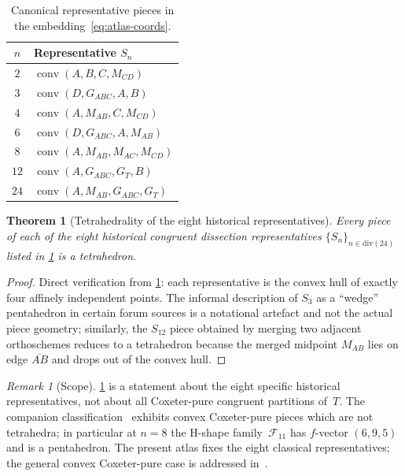 \documentclass[11pt,a4paper]{article}
\theoremstyle{plain}
\newtheorem{theorem}{Theorem}[section]
\theoremstyle{definition}
\theoremstyle{remark}
\newtheorem{remark}[remark]{Remark}
\DeclareMathOperator{\conv}{conv}
\begin{document}
\begin{table}[H]
\centering\small
\caption{Canonical representative pieces in the embedding~\eqref{eq:atlas-coords}.}
\label{tab:atlas-reps}
\begin{tabular}{@{}cl@{}}
\toprule
$n$ & Representative $S_{n}$ \\
\midrule
$2$  & $\conv(A,B,C,M_{CD})$ \\
$3$  & $\conv(D,G_{ABC},A,B)$ \\
$4$  & $\conv(A,M_{AB},C,M_{CD})$ \\
$6$  & $\conv(D,G_{ABC},A,M_{AB})$ \\
$8$  & $\conv(A,M_{AB},M_{AC},M_{CD})$ \\
$12$ & $\conv(A,G_{ABC},G_{T},B)$ \\
$24$ & $\conv(A,M_{AB},G_{ABC},G_{T})$ \\
\bottomrule
\end{tabular}
\end{table}

\begin{theorem}[Tetrahedrality of the eight historical representatives]\label{thm:univ-tet}
Every piece of each of the eight historical congruent dissection
representatives $\{S_{n}\}_{n \in \mathrm{div}(24)}$ listed in
\cref{tab:atlas-reps} is a tetrahedron.
\end{theorem}

\begin{proof}
Direct verification from \cref{tab:atlas-reps}: each representative is the
convex hull of exactly four affinely independent points.  The informal
description of $S_{3}$ as a ``wedge'' pentahedron in certain forum sources is
a notational artefact and not the actual piece geometry; similarly, the
$S_{12}$ piece obtained by merging two adjacent orthoschemes reduces to a
tetrahedron because the merged midpoint $M_{AB}$ lies on edge $\overline{AB}$
and drops out of the convex hull.
\end{proof}

\begin{remark}[Scope]\label{rem:univ-tet-scope}
\cref{thm:univ-tet} is a statement about the eight specific historical
representatives, not about all Coxeter-pure congruent partitions of~$T$.
The companion classification~\cite{CoxeterPure2026} exhibits convex
Coxeter-pure pieces which are not tetrahedra; in particular at $n=8$ the
H-shape family~$\mathcal{F}_{11}$ has $f$-vector $(6,9,5)$ and is a
pentahedron.  The present atlas fixes the eight classical
representatives; the general convex Coxeter-pure case is
addressed in~\cite{CoxeterPure2026}.
\end{remark}
\end{document}
